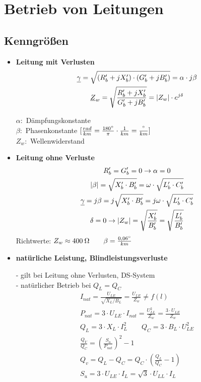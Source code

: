 \section{Betrieb von Leitungen}
\subsection{Kenngrößen}

\begin{itemize}
    \item[] \textbf{Leitung mit Verlusten}
    \begin{gather*}
        \underline{\gamma} = \sqrt{(R'_b +jX'_b)\cdot(G'_b+jB'_b)}= \alpha \cdot j \beta\\
        \underline{Z}_w = \sqrt{\dfrac{R'_b + jX'_b}{G'_b + jB'_b}}= |Z_w| \cdot e^{j\delta}
    \end{gather*}

    \indent $\alpha:$ Dämpfungskonstante\\
    \indent $\beta:$ Phasenkonstante $[\frac{rad}{km} = \frac{180\degree}{\pi} \cdot \frac{1}{km} = \frac{\degree}{km}]$\\
    \indent $Z_w:$ Wellenwiderstand\\

    \item[] \textbf{Leitung ohne Verluste}
        \begin{gather*}
            R'_b = G'_b = 0\rightarrow \alpha = 0\\
            |\beta| = \sqrt{X'_b \cdot B'_b} = \omega \cdot \sqrt{L'_b \cdot C'_b}\\
            \underline{\gamma} = j \beta = j \sqrt{X'_b \cdot B'_b} = j \omega \cdot \sqrt{L'_b \cdot C'_b}\\
            \delta = 0 \rightarrow |Z_w| = \sqrt{ \dfrac{X'_b}{B'_b} } = \sqrt{ \dfrac{L'_b}{B'_b} }
        \end{gather*}
    Richtwerte:
            $Z_w \approx 400\: \ohm \qquad \beta = \frac{0,06\degree}{km}$\\

    \item[] \textbf{natürliche Leistung, Blindleistungsverluste}

        - gilt bei Leitung ohne Verlusten, DS-System\\
        - natürlicher Betrieb bei $Q_L = Q_C$
        \begin{gather*}
            I_{nat} = \frac{U_{LE}}{\sqrt{X_L/B_L}} =  \frac{U_{LE}}{Z_w} \neq f(l)\\
            P_{nat} = 3 \cdot U_{LE} \cdot I_{nat} = \frac{U^2_{LL}}{Z_w} = \frac{3 \cdot U_{LE}}{Z_w}\\
            Q_L = 3 \cdot X_L \cdot I_L^2 \qquad Q_C = 3 \cdot B_L \cdot U^2_{LE}\\
            \frac{Q_V}{Q_C} = \left(\frac{S_u}{P_{nat}} \right)^2-1\\
            Q_v = Q_L - Q_C = Q_C \cdot (\frac{Q_L}{Q_C}-1)\\
            S_u = 3 \cdot U_{LE} \cdot {I_L} = \sqrt{3} \cdot U_{LL} \cdot I_L
        \end{gather*}


\end{itemize}
